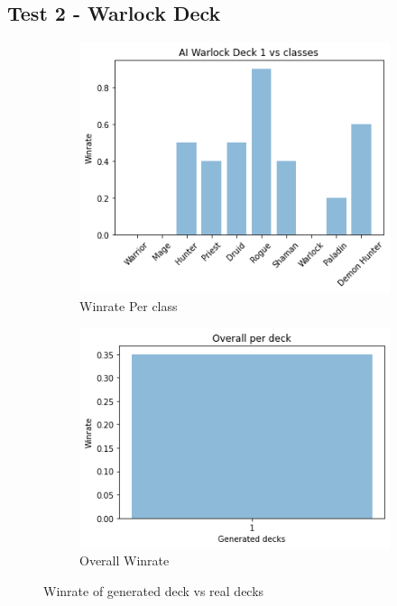 \documentclass{report} %
\begin{document}
\subsection{Test 2 - Warlock Deck}
\begin{figure}[H]
\centering
\begin{subfigure}{.5\textwidth}
  \centering
  \includegraphics[width=1\linewidth]{TestImages/WarlockDeckWinrateClasses}
  \caption{Winrate Per class}
\end{subfigure}%
\begin{subfigure}{.5\textwidth}
  \centering
  \includegraphics[width=1\linewidth]{TestImages/WarlockAllGeneratedDeckOverallWinrate}
  \caption{Overall Winrate}
\end{subfigure}
\caption{Winrate of generated deck vs real decks}
\end{figure}
\end{document}

